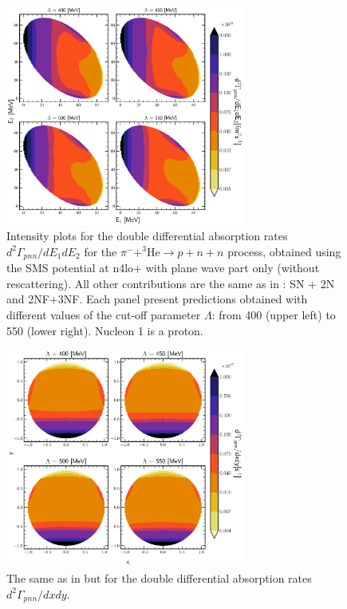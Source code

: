     \begin{figure}[h]
        \begin{center}
        \includegraphics[width=0.7\textwidth]{PlotData/PION/Dalitz_maps/figures/Dalitz_map_pnn_E1E2_cutofs_PWIAS.pdf}
        \end{center}
        \caption{Intensity plots for the double differential absorption rates
        $d^2 \Gamma_{pnn}/dE_1dE_2$ for the $\pi^- + ^3\text{He} \rightarrow p + n + n$
        process, obtained using the SMS potential at \gls{n4lo+}
        with plane wave part only (without rescattering).
        All other contributions are the same as in : SN + 2N and 2NF+3NF.
        Each panel present predictions obtained with different values of the cut-off parameter $\Lambda$:
        from \SI{400}{\mev} (upper left) to \SI{550}{\mev} (lower right). Nucleon 1 is a proton.}
        \label{pion_map_E1E2_cutoff_PW}
    \end{figure}

    \begin{figure}[h]
        \begin{center}
        \includegraphics[width=0.7\textwidth]{PlotData/PION/Dalitz_maps/figures/Dalitz_map_pnn_xy_cutofs_PWIAS.pdf}
        \end{center}
        \caption{The same as in  but for the double differential absorption rates
        $d^2 \Gamma_{pnn}/dxdy$.}
        \label{pion_map_xy_cutoff_PW}
    \end{figure}


